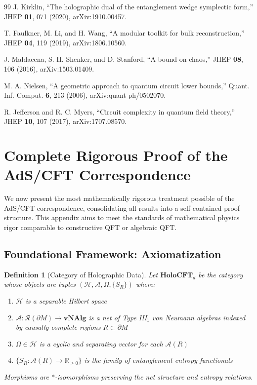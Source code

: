 \documentclass[12pt,a4paper]{article}
\newtheorem{definition}[theorem]{Definition}
\begin{document}
\begin{thebibliography}{99}
J. Kirklin, ``The holographic dual of the entanglement wedge symplectic form,'' JHEP \textbf{01}, 071 (2020), arXiv:1910.00457.

T. Faulkner, M. Li, and H. Wang, ``A modular toolkit for bulk reconstruction,'' JHEP \textbf{04}, 119 (2019), arXiv:1806.10560.

J. Maldacena, S. H. Shenker, and D. Stanford, ``A bound on chaos,'' JHEP \textbf{08}, 106 (2016), arXiv:1503.01409.

M. A. Nielsen, ``A geometric approach to quantum circuit lower bounds,'' Quant. Inf. Comput. \textbf{6}, 213 (2006), arXiv:quant-ph/0502070.

R. Jefferson and R. C. Myers, ``Circuit complexity in quantum field theory,'' JHEP \textbf{10}, 107 (2017), arXiv:1707.08570.

\end{thebibliography}

\appendix

\section{Complete Rigorous Proof of the AdS/CFT Correspondence}
\label{sec:complete-proof}

We now present the most mathematically rigorous treatment possible of the AdS/CFT correspondence, consolidating all results into a self-contained proof structure. This appendix aims to meet the standards of mathematical physics rigor comparable to constructive QFT or algebraic QFT.

\subsection{Foundational Framework: Axiomatization}

\begin{definition}[Category of Holographic Data]\label{def:holo-data-cat}
Let $\mathbf{HoloCFT}_d$ be the category whose objects are tuples $(\mathcal{H}, \mathcal{A}, \Omega, \{S_R\})$ where:
\begin{enumerate}
    \item $\mathcal{H}$ is a separable Hilbert space
    \item $\mathcal{A}: \mathcal{R}(\partial M) \to \mathbf{vNAlg}$ is a net of Type III$_1$ von Neumann algebras indexed by causally complete regions $R \subset \partial M$
    \item $\Omega \in \mathcal{H}$ is a cyclic and separating vector for each $\mathcal{A}(R)$
    \item $\{S_R: \mathcal{A}(R) \to \mathbb{R}_{\geq 0}\}$ is the family of entanglement entropy functionals
\end{enumerate}
Morphisms are $*$-isomorphisms preserving the net structure and entropy relations.
\end{definition}
\end{document}
